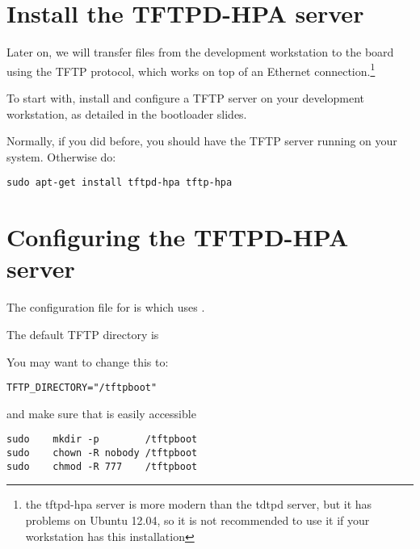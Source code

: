 

\section{Install the TFTPD-HPA server}

Later on, we will transfer files from the development workstation to
the board using the TFTP protocol, which works on top of an Ethernet
connection.\footnote{the tftpd-hpa server is more modern than the
tdtpd server, but it has problems on Ubuntu 12.04, 
so it is not recommended to use it if your workstation has this installation}

To start with, install and configure a TFTP server on your development
workstation, as detailed in the bootloader slides.

Normally, if you did  before, you should have
the TFTP server running on your system. Otherwise do:

\begin{verbatim}
sudo apt-get install tftpd-hpa tftp-hpa
\end{verbatim}

\section{Configuring the TFTPD-HPA server}

The configuration file for  is 
which uses .

The default TFTP directory is 

You may want to change this to:

\begin{verbatim}
TFTP_DIRECTORY="/tftpboot"
\end{verbatim}

and make sure that   is easily accessible

\begin{verbatim}
sudo    mkdir -p        /tftpboot
sudo    chown -R nobody /tftpboot
sudo    chmod -R 777    /tftpboot
\end{verbatim}

